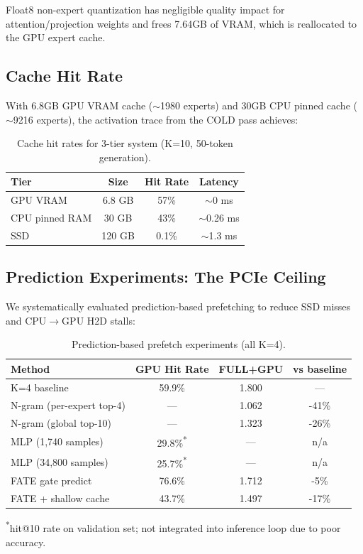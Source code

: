 \documentclass[conference]{IEEEtran}
\begin{document}
Float8 non-expert quantization has negligible quality impact for attention/projection weights and frees 7.64GB of VRAM, which is reallocated to the GPU expert cache.

\subsection{Cache Hit Rate}

With 6.8GB GPU VRAM cache ($\sim$1980 experts) and 30GB CPU pinned cache ($\sim$9216 experts), the activation trace from the COLD pass achieves:

\begin{table}[t]
\centering
\caption{Cache hit rates for 3-tier system (K=10, 50-token generation).}
\label{tab:hitrate}
\begin{tabular}{lccc}
\toprule
Tier & Size & Hit Rate & Latency \\
\midrule
GPU VRAM & 6.8 GB & 57\% & $\sim$0 ms \\
CPU pinned RAM & 30 GB & 43\% & $\sim$0.26 ms \\
SSD & 120 GB & 0.1\% & $\sim$1.3 ms \\
\bottomrule
\end{tabular}
\end{table}

\subsection{Prediction Experiments: The PCIe Ceiling}
\label{sec:prediction}

We systematically evaluated prediction-based prefetching to reduce SSD misses and CPU$\to$GPU H2D stalls:

\begin{table}[t]
\centering
\caption{Prediction-based prefetch experiments (all K=4).}
\label{tab:prediction}
\begin{tabular}{lccc}
\toprule
Method & GPU Hit Rate & FULL+GPU & vs baseline \\
\midrule
K=4 baseline & 59.9\% & 1.800 & --- \\
N-gram (per-expert top-4) & --- & 1.062 & -41\% \\
N-gram (global top-10) & --- & 1.323 & -26\% \\
MLP (1,740 samples) & 29.8\%\textsuperscript{*} & --- & n/a \\
MLP (34,800 samples) & 25.7\%\textsuperscript{*} & --- & n/a \\
FATE gate predict & 76.6\% & 1.712 & -5\% \\
FATE + shallow cache & 43.7\% & 1.497 & -17\% \\
\bottomrule
\end{tabular}
\vspace{1mm}

\textsuperscript{*}hit@10 rate on validation set; not integrated into inference loop due to poor accuracy.
\end{table}
\end{document}
